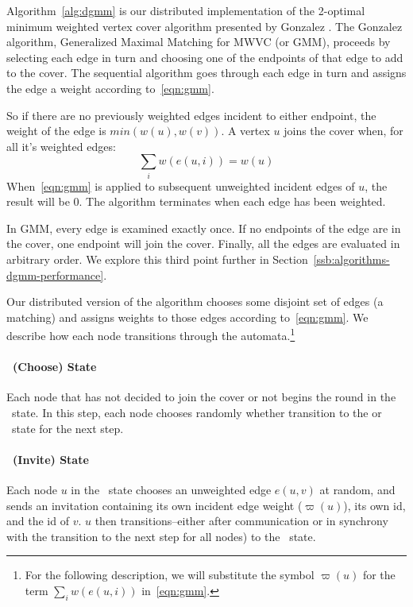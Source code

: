 \label{sec:dgmm-description}

Algorithm~\ref{alg:dgmm} is our distributed implementation of the 2-optimal minimum weighted vertex cover algorithm presented by Gonzalez \cite{Gonzalez1995129}. The Gonzalez algorithm, Generalized Maximal Matching for MWVC (or GMM), proceeds by selecting each edge in turn and choosing one of the endpoints of that edge to add to the cover. The sequential algorithm goes through each edge in turn and assigns the edge a weight according to~\eqref{eqn:gmm}.



So if there are no previously weighted edges incident to either endpoint, the weight of the edge is $min(w(u),w(v))$. A vertex $u$ joins the cover when, for all it's weighted edges: \begin{equation}\sum_i w(e(u,i)) = w(u) \label{eqn:sat} \end{equation} When~\eqref{eqn:gmm} is applied to subsequent unweighted incident edges of $u$, the result will be 0. The algorithm terminates when each edge has been weighted. 

In GMM, every edge is examined exactly once. If no endpoints of the edge are in the cover, one endpoint will join the cover. Finally, all the edges are evaluated in arbitrary order. We explore this third point further in Section~\ref{ssb:algorithms-dgmm-performance}. 

Our distributed version of the algorithm chooses some disjoint set of edges (a matching) and assigns weights to those edges according to~\eqref{eqn:gmm}. We describe how each node transitions through the automata.\footnote{For the following description, we will substitute the symbol $\varpi(u)$ for the term $\sum_i w(e(u,i))$ in~\eqref{eqn:gmm}.\label{fn:varpi}}

\paragraph{\cCd\ (Choose) State} 
Each node that has not decided to join the cover or not begins the round in the \cDd\ state. In this step, each node chooses randomly whether transition to the \cId or \cLd\ state for the next step.

\paragraph{\cId\ (Invite) State}
Each node $u$ in the \cId\ state chooses an unweighted edge $e(u,v)$ at random, and sends an invitation containing its own incident edge weight ($\varpi(u)$)\footnotemark[\value{footnote}], its own id, and the id of $v$. $u$ then transitions--either after communication or in synchrony with the transition to the next step for all nodes) to the \cWd\ state. 

